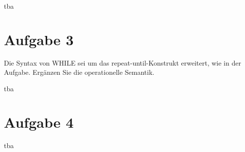 \documentclass[11pt,a4paper,ngerman]{article}
\begin{document}
tba

\section*{Aufgabe 3}
Die Syntax von WHILE sei um das repeat-until-Konstrukt erweitert, wie in der Aufgabe. Ergänzen Sie die operationelle Semantik.

tba

\section*{Aufgabe 4}

tba

\label{LastPage}
\end{document}
